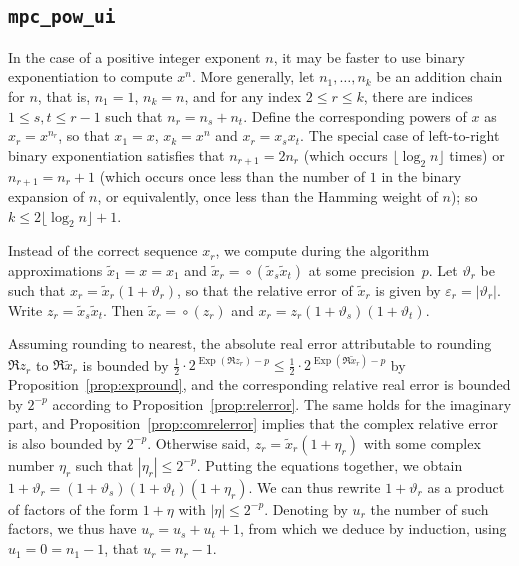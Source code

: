 \documentclass [11pt]{article}
\newcommand {\corr}[1]{{#1}}
\newcommand {\appro}[1]{\widetilde {#1}}
\DeclareMathOperator{\Exp}{\operatorname {Exp}}
\newcommand {\round}{\operatorname {\circ}}
\renewcommand {\epsilon}{\varepsilon}
\renewcommand {\theta}{\vartheta}
\renewcommand {\leq}{\leqslant}
\begin{document}
\subsection {\texttt {mpc\_pow\_ui}}
\label {ssec:mpcpowui}

In the case of a positive integer exponent $n$, it may be faster to use
binary exponentiation to compute $x^n$. More generally, let
$n_1, \ldots, n_k$ be an addition chain for $n$, that is, $n_1 = 1$,
$n_k = n$, and for any index $2 \leq r \leq k$, there are indices
$1 \leq s, t \leq r-1$ such that $n_r = n_s + n_t$. Define the corresponding
powers of $x$ as $\corr x_r = x^{n_r}$, so that $\corr x_1 = x$,
$\corr x_k = x^n$ and $\corr x_r = \corr x_s \corr x_t$.
The special case of left-to-right binary exponentiation
satisfies that $n_{r+1} = 2 n_r$ (which occurs $\lfloor \log_2 n \rfloor$
times) or $n_{r+1} = n_r + 1$ (which occurs once less than the number of
$1$ in the binary expansion of $n$, or equivalently, once less than the
Hamming weight of $n$); so $k \leq 2 \lfloor \log_2 n \rfloor + 1$.

Instead of the correct sequence $\corr x_r$, we compute during the algorithm
approximations $\appro x_1 = x = \corr x_1$ and
$\appro x_r = \round (\appro x_s \appro x_t)$
at some precision~$p$.
Let $\theta_r$ be such that $\corr x_r = \appro x_r (1 + \theta_r)$, so that
the relative error of $\appro x_r$ is given by $\epsilon_r = |\theta_r|$.
Write $z_r = \appro x_s \appro x_t$.
Then $\appro x_r = \round (z_r)$ and
$\corr x_r = z_r (1 + \theta_s)(1 + \theta_t)$.

Assuming rounding to nearest, the absolute real error attributable to
rounding $\Re z_r$ to $\Re \appro x_r$ is bounded by
$\frac {1}{2} \cdot 2^{\Exp (\Re z_r) - p}
\leq \frac {1}{2} \cdot 2^{\Exp (\Re \appro x_r) - p}$
by Proposition~\ref {prop:expround}, and the corresponding
relative real error is bounded by $2^{-p}$ according to
Proposition~\ref {prop:relerror}. The same holds for the imaginary part,
and Proposition~\ref {prop:comrelerror} implies that the complex
relative error is also bounded by $2^{-p}$. Otherwise said,
$z_r = \appro x_r (1 + \eta_r)$ with
some complex number $\eta_r$ such that $|\eta_r| \leq 2^{-p}$.
Putting the equations together, we obtain
$1 + \theta_r = (1 + \theta_s)(1 + \theta_t)(1 + \eta_r)$.
We can thus rewrite $1 + \theta_r$ as a product of factors of the
form $1 + \eta$ with $|\eta| \leq 2^{-p}$. Denoting by $u_r$ the
number of such factors, we thus have $u_r = u_s + u_t + 1$, from which
we deduce by induction, using $u_1 = 0 = n_1 - 1$,
that $u_r = n_r - 1$.
\end{document}
